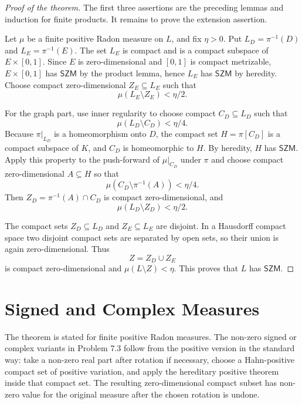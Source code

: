 \documentclass[11pt]{article}
\begin{document}
\begin{proof}[Proof of the theorem]
The first three assertions are the preceding lemmas and induction for finite products.  It remains to prove the extension assertion.

Let \(\mu\) be a finite positive Radon measure on \(L\), and fix \(\eta>0\).  Put \(L_D=\pi^{-1}(D)\) and \(L_E=\pi^{-1}(E)\).  The set \(L_E\) is compact and is a compact subspace of \(E\times[0,1]\).  Since \(E\) is zero-dimensional and \([0,1]\) is compact metrizable, \(E\times[0,1]\) has \(\mathsf{SZM}\) by the product lemma, hence \(L_E\) has \(\mathsf{SZM}\) by heredity.  Choose compact zero-dimensional \(Z_E\subseteq L_E\) such that
\[
\mu(L_E\setminus Z_E)<\eta/2 .
\]

For the graph part, use inner regularity to choose compact \(C_D\subseteq L_D\) such that
\[
\mu(L_D\setminus C_D)<\eta/4 .
\]
Because \(\pi|_{L_D}\) is a homeomorphism onto \(D\), the compact set \(H=\pi[C_D]\) is a compact subspace of \(K\), and \(C_D\) is homeomorphic to \(H\).  By heredity, \(H\) has \(\mathsf{SZM}\).  Apply this property to the push-forward of \(\mu|_{C_D}\) under \(\pi\) and choose compact zero-dimensional \(A\subseteq H\) so that
\[
\mu(C_D\setminus \pi^{-1}(A))<\eta/4 .
\]
Then \(Z_D=\pi^{-1}(A)\cap C_D\) is compact zero-dimensional, and
\[
\mu(L_D\setminus Z_D)<\eta/2 .
\]

The compact sets \(Z_D\subseteq L_D\) and \(Z_E\subseteq L_E\) are disjoint.  In a Hausdorff compact space two disjoint compact sets are separated by open sets, so their union is again zero-dimensional.  Thus
\[
  Z=Z_D\cup Z_E
\]
is compact zero-dimensional and \(\mu(L\setminus Z)<\eta\).  This proves that \(L\) has \(\mathsf{SZM}\).
\end{proof}

\section*{Signed and Complex Measures}

The theorem is stated for finite positive Radon measures.  The non-zero signed or complex variants in Problem 7.3 follow from the positive version in the standard way: take a non-zero real part after rotation if necessary, choose a Hahn-positive compact set of positive variation, and apply the hereditary positive theorem inside that compact set.  The resulting zero-dimensional compact subset has non-zero value for the original measure after the chosen rotation is undone.
\end{document}
